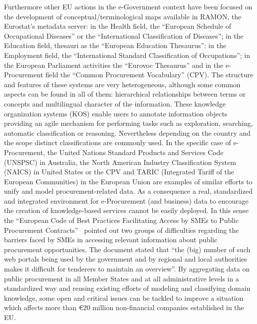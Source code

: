 Furthermore other EU actions in the e-Government context have been focused on the development of conceptual/terminological maps available in RAMON, the Eurostat's metadata server: 
in the Health field, the ``European Schedule of Occupational Diseases'' or  the ``International Classification of Diseases''; in the Education field,  
thesauri as the ``European Education Thesaurus''; in the Employment field, the ``International Standard Classification of Occupations''; 
in the European Parliament activities the ``Eurovoc Thesaurus'' and in the e-Procurement field the ``Common Procurement Vocabulary'' (CPV). 
The structure and features of these systems are very heterogeneous, although some common aspects can be found in all of them: hierarchical relationships between terms or concepts and multilingual character of the information. 
These knowledge organization systems (KOS) enable users to annotate information objects providing an agile mechanism for performing 
tasks such as exploration, searching, automatic classification or reasoning. Nevertheless depending on the country and the scope 
distinct classifications are commonly used. In the specific case of e-Procurement, the United Nations Standard Products and Services Code (UNSPSC) in Australia, 
the North American Industry Classification System (NAICS) in United States or the CPV and TARIC (Integrated Tariff of the European Communities) in the European Union 
are examples of similar efforts to unify and model procurement-related data. As a consequence a real, standardized and integrated environment 
for e-Procurement (and business) data to encourage the creation of knowledge-based services cannot be easily deployed. In this sense the 
``European Code of Best Practices Facilitating Access by SMEs to Public Procurement Contracts''~\cite{d2008} pointed out 
two groups of difficulties regarding the barriers faced by SMEs in accessing relevant information about public procurement opportunities. 
The document stated that ``the (big) number of such web portals being used by the government and by regional and local authorities makes it difficult 
for tenderers to maintain an overview''. By aggregating data on public procurement in all Member States 
and at all administrative levels in a standardized way and reusing existing efforts of modeling 
and classifying domain knowledge, some open and critical issues can be tackled to improve a situation which affects more 
than \euro $20$ million non-financial companies established in the EU.


